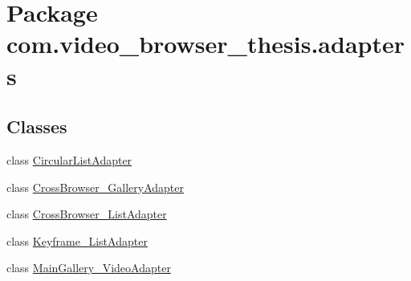 \hypertarget{namespacecom_1_1video__browser__thesis_1_1adapters}{\section{Package com.\-video\-\_\-browser\-\_\-thesis.\-adapters}
\label{namespacecom_1_1video__browser__thesis_1_1adapters}
}
\subsection*{Classes}
\begin{DoxyCompactItemize}
\item 
class \hyperlink{classcom_1_1video__browser__thesis_1_1adapters_1_1_circular_list_adapter}{Circular\-List\-Adapter}
\item 
class \hyperlink{classcom_1_1video__browser__thesis_1_1adapters_1_1_cross_browser___gallery_adapter}{Cross\-Browser\-\_\-\-Gallery\-Adapter}
\item 
class \hyperlink{classcom_1_1video__browser__thesis_1_1adapters_1_1_cross_browser___list_adapter}{Cross\-Browser\-\_\-\-List\-Adapter}
\item 
class \hyperlink{classcom_1_1video__browser__thesis_1_1adapters_1_1_keyframe___list_adapter}{Keyframe\-\_\-\-List\-Adapter}
\item 
class \hyperlink{classcom_1_1video__browser__thesis_1_1adapters_1_1_main_gallery___video_adapter}{Main\-Gallery\-\_\-\-Video\-Adapter}
\end{DoxyCompactItemize}
